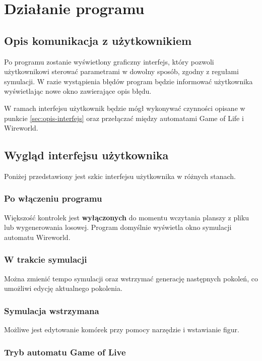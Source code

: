 \documentclass{report}
\begin{document}
\chapter{Działanie programu}

\section{Opis komunikacja z użytkownikiem}
Po programu zostanie wyświetlony graficzny interfejs, który pozwoli użytkownikowi sterować parametrami w dowolny sposób, zgodny z regułami symulacji. W razie wystąpienia błędów program będzie informować użytkownika wyświetlając nowe okno zawierające opis błędu.

W ramach interfejsu użytkownik będzie mógł wykonywać czynności opisane w punkcie \ref{sec:opis-interfejs} oraz przełączać między automatami Game of Life i Wireworld.

\section{Wygląd interfejsu użytkownika}
Poniżej przedstawiony jest szkic interfejsu użytkownika w różnych stanach.

\subsection{Po włączeniu programu}
Większość kontrolek jest \textbf{wyłączonych} do momentu wczytania planszy z pliku lub wygenerowania losowej. Program domyślnie wyświetla okno symulacji automatu Wireworld.

\subsection{W trakcie symulacji}
Można zmienić tempo symulacji oraz wstrzymać generację następnych pokoleń, co umożliwi edycję aktualnego pokolenia.

\subsection{Symulacja wstrzymana}
Możliwe jest edytowanie komórek przy pomocy narzędzie i wstawianie figur.

\subsection{Tryb automatu Game of Live}

\end{document}
